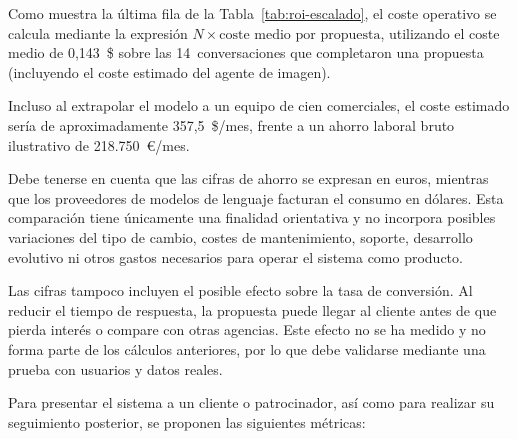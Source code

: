 Como muestra la última fila de la Tabla~\ref{tab:roi-escalado}, el coste operativo se
calcula mediante la expresión
$N \times \text{coste medio por propuesta}$, utilizando el coste medio de
0,143~\$ sobre las 14~conversaciones que completaron una propuesta (incluyendo el coste
estimado del agente de imagen).

Incluso al extrapolar el modelo a un equipo de cien comerciales, el coste estimado sería
de aproximadamente 357,5~\$/mes, frente a un ahorro laboral bruto ilustrativo de
218.750~€/mes.

Debe tenerse en cuenta que las cifras de ahorro se expresan en euros, mientras que los
proveedores de modelos de lenguaje facturan el consumo en dólares. Esta comparación
tiene únicamente una finalidad orientativa y no incorpora posibles variaciones del tipo
de cambio, costes de mantenimiento, soporte, desarrollo evolutivo ni otros gastos
necesarios para operar el sistema como producto.

Las cifras tampoco incluyen el posible efecto sobre la tasa de conversión. Al reducir el
tiempo de respuesta, la propuesta puede llegar al cliente antes de que pierda interés o
compare con otras agencias. Este efecto no se ha medido y no forma parte de los cálculos
anteriores, por lo que debe validarse mediante una prueba con usuarios y datos reales.


Para presentar el sistema a un cliente o patrocinador, así como para realizar su
seguimiento posterior, se proponen las siguientes métricas:

